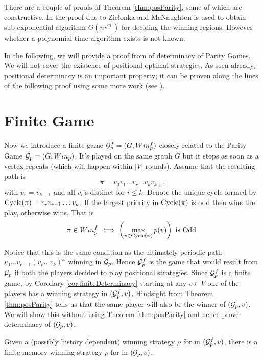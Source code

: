 There are a couple of proofs of Theorem \ref{thm:posParity}, some of which are constructive. In \cite{subexp} the proof due to Zielonka \cite{zielonka_infinite_1998} and McNaughton \cite{mcnaughton_infinite_1993} is used to obtain sub-exponential algorithm $O(n^{\sqrt{n}})$ for deciding the winning regions. However whether a polynomial time algorithm exists is not known. 

In the following, we will provide a proof from \cite{bjorklund_memoryless_2004} of determinacy of Parity Games. We will not cover the existence of positional optimal strategies. As seen already, positional determinacy is an important property; it can be proven along the lines of the following proof using some more work (see \cite{bjorklund_memoryless_2004}).

\section{Finite Game}
\label{sec:parityFiniteGame}

Now we introduce a finite game $\mathcal{G}^f_p=(G,Win^f_p)$ closely related to the Parity Game $\mathcal{G}_p=(G,Win_p)$. It's played on the same graph $G$ but it stops as soon as a vertex repeats (which will happen within $|V|$ rounds). Assume that the resulting path is 
\[
    \pi = v_0v_1 \ldots v_r \ldots v_k v_{k+1}
\] 
with $v_r = v_{k+1}$ and all $v_i$'s distinct for $i \leq k$. Denote the unique cycle formed by $\operatorname{Cycle}(\pi)=v_r v_{r+1} \ldots v_k$. If the largest priority in $\operatorname{Cycle}(\pi)$ is odd then  wins the play, otherwise  wins. That is  
\[
    \pi \in Win^f_p \iff \left(\max_{v \in \operatorname{Cycle}(\pi)} p(v)\right) \text{ is Odd }
\]

Notice that this is the same condition as the ultimately periodic path $v_0 \ldots v_{r-1} (v_r \ldots v_k)^\omega$ winning in $\mathcal{G}_p$. Hence $\mathcal{G}^f_p$ is the game that would result from $\mathcal{G}_p$ if both the players decided to play positional strategies. Since $\mathcal{G}^f_p$ is a finite game, by Corollary \ref{cor:finiteDeterminacy} starting at any $v \in V$ one of the players has a winning strategy in $(\mathcal{G}^f_p, v)$. Hindsight from Theorem \ref{thm:posParity} tells us that the same player will also be the winner of $(\mathcal{G}_p,v)$. We will show this without using Theorem \ref{thm:posParity} and hence prove determinacy of $(\mathcal{G}_p,v)$.\\
\begin{theorem}
    \label{thm:parityDet}
    Given a (possibly history dependent) winning strategy $\rho$ for  in $(\mathcal{G}^f_p,v)$, there is a finite memory winning strategy $\tilde{\rho}$ for  in $(\mathcal{G}_p,v)$.
\end{theorem}


